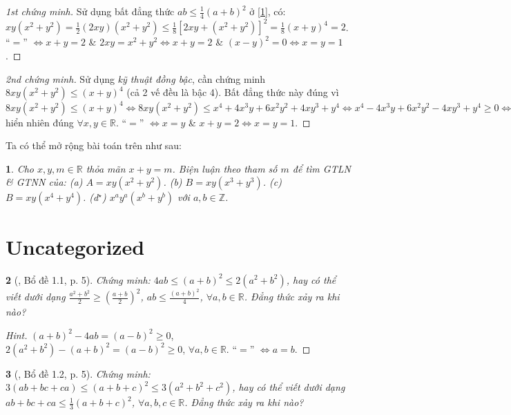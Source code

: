 \documentclass{article}
\newtheorem{baitoan}{}
\begin{document}
\begin{proof}[1st chứng minh]
	Sử dụng bất đẳng thức $ab\le\frac{1}{4}(a + b)^2$ ở \eqref{1}, có: $xy(x^2 + y^2) = \frac{1}{2}(2xy)(x^2 + y^2)\le\frac{1}{8}[2xy + (x^2 + y^2)]^2 = \frac{1}{8}(x + y)^4 = 2$. ``$=$'' $\Leftrightarrow x + y = 2$ \& $2xy = x^2 + y^2\Leftrightarrow x + y = 2$ \& $(x - y)^2 = 0\Leftrightarrow x = y = 1$.
\end{proof}

\begin{proof}[2nd chứng minh]
	Sử dụng \textit{kỹ thuật đồng bậc}, cần chứng minh $8xy(x^2 + y^2)\le(x + y)^4$ (cả 2 vế đều là bậc 4). Bất đẳng thức này đúng vì $8xy(x^2 + y^2)\le(x + y)^4\Leftrightarrow8xy(x^2 + y^2)\le x^4 + 4x^3y + 6x^2y^2 + 4xy^3 + y^4\Leftrightarrow x^4 - 4x^3y + 6x^2y^2 - 4xy^3 + y^4\ge0\Leftrightarrow(x - y)^4\ge0$ hiển nhiên đúng $\forall x,y\in\mathbb{R}$. ``$=$'' $\Leftrightarrow x = y$ \& $x + y = 2\Leftrightarrow x = y = 1$.
\end{proof}
Ta có thể mở rộng bài toán trên như sau:

\begin{baitoan}
	Cho $x,y,m\in\mathbb{R}$ thỏa mãn $x + y = m$. Biện luận theo tham số $m$ để tìm {\rm GTLN} \& {\rm GTNN} của: (a) $A = xy(x^2 + y^2)$. (b) $B = xy(x^3 + y^3)$. (c) $B = xy(x^4 + y^4)$. (d${}^\star$) $x^ay^a(x^b + y^b)$ với $a,b\in\mathbb{Z}$. 
\end{baitoan}


\section{Uncategorized}

\begin{baitoan}[\cite{Son_Nghiep_Trung_Can2021}, Bổ đề 1.1, p. 5]
	Chứng minh: $4ab\le(a + b)^2\le2(a^2 + b^2)$, hay có thể viết dưới dạng $\frac{a^2 + b^2}{2}\ge\left(\frac{a + b}{2}\right)^2$, $ab\le\frac{(a + b)^2}{4}$, $\forall a,b\in\mathbb{R}$. Đẳng thức xảy ra khi nào?
\end{baitoan}

\begin{proof}[Hint]
	$(a + b)^2 - 4ab = (a - b)^2\ge 0$, $2(a^2 + b^2) - (a + b)^2 = (a - b)^2\ge 0$, $\forall a,b\in\mathbb{R}$. ``$=$'' $\Leftrightarrow a = b$.
\end{proof}

\begin{baitoan}[\cite{Son_Nghiep_Trung_Can2021}, Bổ đề 1.2, p. 5]
	Chứng minh: $3(ab + bc + ca)\le(a + b + c)^2\le3(a^2 + b^2 + c^2)$, hay có thể viết dưới dạng $ab + bc + ca\le\frac{1}{3}(a + b + c)^2$, $\forall a,b,c\in\mathbb{R}$. Đẳng thức xảy ra khi nào?
\end{baitoan}
\end{document}
